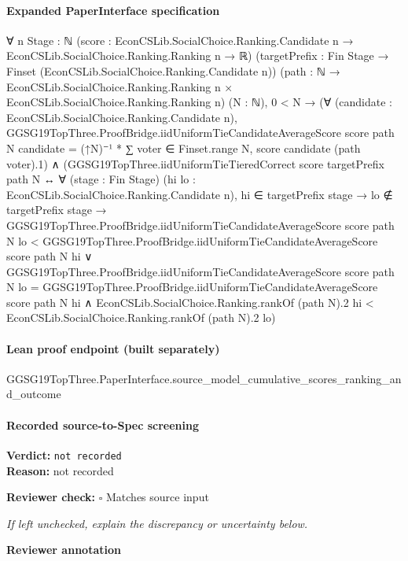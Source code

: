 \documentclass[10pt]{article}
\newcommand{\reviewerbox}{%
  \par\noindent\fbox{\parbox{0.96\linewidth}{\rule{0pt}{0.38in}}}\par
}
\newcommand{\reviewmatch}[1]{%
  \par\noindent\textbf{Reviewer check:} $\square$\; #1\par
  \noindent\emph{If left unchecked, explain the discrepancy or uncertainty below.}\par
}
\begin{document}
\paragraph{Expanded PaperInterface specification}
\begin{ReviewVerbatim}
∀ {n Stage : ℕ} (score : EconCSLib.SocialChoice.Ranking.Candidate n → EconCSLib.SocialChoice.Ranking.Ranking n → ℝ)
  (targetPrefix : Fin Stage → Finset (EconCSLib.SocialChoice.Ranking.Candidate n))
  (path : ℕ → EconCSLib.SocialChoice.Ranking.Ranking n × EconCSLib.SocialChoice.Ranking.Ranking n) (N : ℕ),
  0 < N →
    (∀ (candidate : EconCSLib.SocialChoice.Ranking.Candidate n),
        GGSG19TopThree.ProofBridge.iidUniformTieCandidateAverageScore score path N candidate =
          (↑N)⁻¹ * ∑ voter ∈ Finset.range N, score candidate (path voter).1) ∧
      (GGSG19TopThree.iidUniformTieTieredCorrect score targetPrefix path N ↔
        ∀ (stage : Fin Stage) (hi lo : EconCSLib.SocialChoice.Ranking.Candidate n),
          hi ∈ targetPrefix stage →
            lo ∉ targetPrefix stage →
              GGSG19TopThree.ProofBridge.iidUniformTieCandidateAverageScore score path N lo <
                  GGSG19TopThree.ProofBridge.iidUniformTieCandidateAverageScore score path N hi ∨
                GGSG19TopThree.ProofBridge.iidUniformTieCandidateAverageScore score path N lo =
                    GGSG19TopThree.ProofBridge.iidUniformTieCandidateAverageScore score path N hi ∧
                  EconCSLib.SocialChoice.Ranking.rankOf (path N).2 hi <
                    EconCSLib.SocialChoice.Ranking.rankOf (path N).2 lo)
\end{ReviewVerbatim}

\paragraph{Lean proof endpoint (built separately)}\begin{ReviewVerbatim}
GGSG19TopThree.PaperInterface.source_model_cumulative_scores_ranking_and_outcome
\end{ReviewVerbatim}

\paragraph{Recorded source-to-Spec screening}
\textbf{Verdict:} \texttt{not recorded}
\\
\textbf{Reason:} not recorded
\reviewmatch{Matches source input}
\noindent\textbf{Reviewer annotation}\par
\reviewerbox
\clearpage
\hypertarget{source-claim-f23d4127b55f0381}{}
\end{document}
